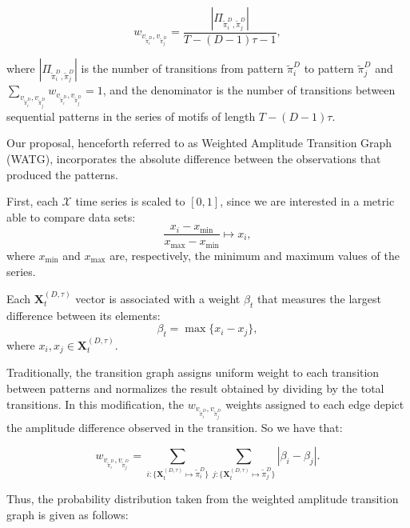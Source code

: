 \documentclass[paper=letter, fontsize=12pt]{article}
\begin{document}
\begin{equation}
w_{v_{\widetilde\pi^D_i}, v_{\widetilde\pi^D_j}} = \frac{|\Pi_{\widetilde\pi^D_i,\widetilde\pi^D_j}|}{T-(D-1)\tau-1},
\end{equation}

where $|\Pi_{\widetilde\pi^D_i,\widetilde\pi^D_j}|$ is the number of transitions from pattern $\widetilde\pi^D_i$ to pattern $\widetilde\pi^D_j$ and \\$\sum_{v_{\widetilde\pi^D_i}, v_{\widetilde\pi^D_j}}w_{v_{\widetilde\pi^D_i}, v_{\widetilde\pi^D_j}} = 1$,
and the denominator is the number of transitions between sequential patterns in the series of motifs of length $T-(D-1)\tau$.

Our proposal, henceforth referred to as Weighted Amplitude Transition Graph (WATG), incorporates the absolute difference between the observations that produced the patterns.

First, each $\mathcal{X}$ time series is scaled to $[0, 1]$, since we are interested in a metric able to compare data sets:
\begin{equation}
 \frac{x_i - x_{\min}}{x_{\max} - x_{\min}} \longmapsto x_i,
\end{equation}
where $x_{\min}$ and $x_{\max}$ are, respectively, the minimum and maximum values of the series.

Each $\mathbf{X}^{(D, \tau)}_t$ vector is associated with a weight $\beta_t$ that measures the largest difference between its elements:
\begin{equation}
\beta_t = \max\{x_i - x_j\},
\end{equation}
where $x_i, x_j \in \mathbf{X}^{(D, \tau)}_t$.

Traditionally, the transition graph assigns uniform weight to each transition between patterns and normalizes the result obtained by dividing by the total transitions.
In this modification, the $w_{v_{\widetilde\pi^D_i}, v_{\widetilde\pi^D_j}}$ weights assigned to each edge depict the amplitude difference observed in the transition.
So we have that:	

\begin{equation}
w_{v_{\widetilde \pi^D_i}, v_{\widetilde \pi^D_j}} =  \sum_{i : \{\mathbf{X}^{(D,\tau)}_t \mapsto \widetilde\pi^D_i\}} \sum_{j : \{\mathbf{X}^{(D,\tau)}_t \mapsto \widetilde\pi^D_j\}} |\beta_i - \beta_j| .
\end{equation}

Thus, the probability distribution taken from the weighted amplitude transition graph is given as follows:	
\end{document}
